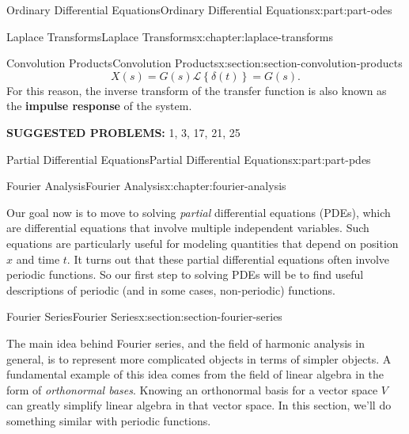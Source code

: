 \documentclass[twoside,10pt,]{book}
\newcommand{\terminology}[1]{\textbf{#1}}
\numberwithin{equation}{part}
\newcommand{\Laplace}[1]{\mathcal{L}\left\{#1\right\}}
\begin{document}
\begin{partptx}{Ordinary Differential Equations}{}{Ordinary Differential Equations}{}{}{x:part:part-odes}
\begin{chapterptx}{Laplace Transforms}{}{Laplace Transforms}{}{}{x:chapter:laplace-transforms}
\begin{sectionptx}{Convolution Products}{}{Convolution Products}{}{}{x:section:section-convolution-products}
\begin{equation*}
X(s) = G(s)\Laplace{\delta(t)} = G(s)\text{.}
\end{equation*}
For this reason, the inverse transform of the transfer function is also known as the \terminology{impulse response} of the system.%
\par
\terminology{SUGGESTED PROBLEMS:} 1, 3, 17, 21, 25%
\end{sectionptx}
\end{chapterptx}
 \end{partptx}
%
%
\typeout{************************************************}
\typeout{************************************************}
%
\begin{partptx}{Partial Differential Equations}{}{Partial Differential Equations}{}{}{x:part:part-pdes}
%
\typeout{************************************************}
\typeout{************************************************}
%
\begin{chapterptx}{Fourier Analysis}{}{Fourier Analysis}{}{}{x:chapter:fourier-analysis}
\begin{introduction}{}%
Our goal now is to move to solving \emph{partial} differential equations (PDEs), which are differential equations that involve multiple independent variables. Such equations are particularly useful for modeling quantities that depend on position \(x\) and time \(t\). It turns out that these partial differential equations often involve periodic functions. So our first step to solving PDEs will be to find useful descriptions of periodic (and in some cases, non-periodic) functions.%
\end{introduction}%
%
%
\typeout{************************************************}
\typeout{************************************************}
%
\begin{sectionptx}{Fourier Series}{}{Fourier Series}{}{}{x:section:section-fourier-series}
\begin{introduction}{}%
The main idea behind Fourier series, and the field of harmonic analysis in general, is to represent more complicated objects in terms of simpler objects. A fundamental example of this idea comes from the field of linear algebra in the form of \emph{orthonormal bases}. Knowing an orthonormal basis for a vector space \(V\) can greatly simplify linear algebra in that vector space. In this section, we'll do something similar with periodic functions.%
\end{introduction}%

\end{sectionptx}
\end{chapterptx}
\end{partptx}
\end{document}
